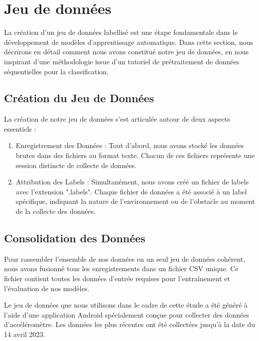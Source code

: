 \section{Jeu de données}

La création d'un jeu de données labellisé est une étape fondamentale dans le développement de modèles d'apprentissage automatique. Dans cette section, nous décrirons en détail comment nous avons constitué notre jeu de données, en nous inspirant d'une méthodologie issue d'un tutoriel de prétraitement de données séquentielles pour la classification.

\subsection{Création du Jeu de Données}
La création de notre jeu de données s'est articulée autour de deux aspects essentiels :
\begin{enumerate}
    \item Enregistrement des Données : Tout d'abord, nous avons stocké les données brutes dans des fichiers au format texte. Chacun de ces fichiers représente une session distincte de collecte de données.
    \item Attribution des Labels : Simultanément, nous avons créé un fichier de labels avec l'extension ".labels". Chaque fichier de données a été associé à un label spécifique, indiquant la nature de l'environnement ou de l'obstacle au moment de la collecte des données.
\end{enumerate}

\subsection{Consolidation des Données}
Pour rassembler l'ensemble de nos données en un seul jeu de données cohérent, nous avons fusionné tous les enregistrements dans un fichier CSV unique. Ce fichier contient toutes les données d'entrée requises pour l'entraînement et l'évaluation de nos modèles.

Le jeu de données que nous utilisons dans le cadre de cette étude a été généré à l'aide d'une application Android spécialement conçue pour collecter des données d'accéléromètre. Les données les plus récentes ont été collectées jusqu'à la date du 14 avril 2023.

